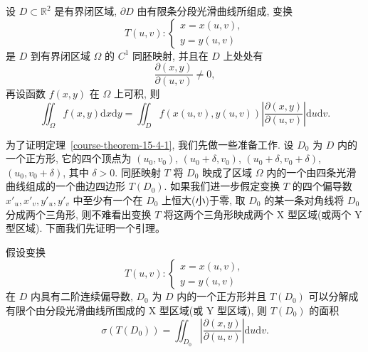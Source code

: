 \documentclass[12pt,fontset=fandol]{ctexart}
\begin{document}
\begin{theorem}\label{course-theorem-15-4-1}\quad 设 $D\subset\mathbb R^2$ 是有界闭区域, $\partial D$ 由有限条分段光滑曲线所组成, 变换
\[
  T(u,v):
  \begin{cases}
    x=x(u,v),\\
    y=y(u,v)
  \end{cases}
\]
是 $D$ 到有界闭区域 $\Omega$ 的 $C^1$ 同胚映射, 并且在 $D$ 上处处有
\[
  \frac{\partial(x,y)}{\partial(u,v)}\ne0,
\]
再设函数 $f(x,y)$ 在 $\Omega$ 上可积, 则
\[
  \iint_\Omega f(x,y)\mathrm dx\mathrm dy
  =\iint_D f(x(u,v),y(u,v))
  \left|\frac{\partial(x,y)}{\partial(u,v)}\right|\mathrm du\mathrm dv.
\]

为了证明定理~\ref{course-theorem-15-4-1}, 我们先做一些准备工作. 设 $D_0$ 为 $D$ 内的一个正方形, 它的四个顶点为 $(u_0,v_0)$, $(u_0+\delta,v_0)$, $(u_0+\delta,v_0+\delta)$, $(u_0,v_0+\delta)$, 其中 $\delta>0$. 同胚映射 $T$ 将 $D_0$ 映成了区域 $\Omega$ 内的一个由四条光滑曲线组成的一个曲边四边形 $T(D_0)$. 如果我们进一步假定变换 $T$ 的四个偏导数 $x'_u,x'_v,y'_u,y'_v$ 中至少有一个在 $D_0$ 上恒大(小)于零, 取 $D_0$ 的某一条对角线将 $D_0$ 分成两个三角形, 则不难看出变换 $T$ 将这两个三角形映成两个 X 型区域(或两个 Y 型区域). 下面我们先证明一个引理。

\end{theorem}
\begin{lemma}\label{course-lemma-15-4-2}\quad 假设变换
\[
  T(u,v):
  \begin{cases}
    x=x(u,v),\\
    y=y(u,v)
  \end{cases}
\]
在 $D$ 内具有二阶连续偏导数, $D_0$ 为 $D$ 内的一个正方形并且 $T(D_0)$ 可以分解成有限个由分段光滑曲线所围成的 X 型区域(或 Y 型区域), 则 $T(D_0)$ 的面积
\[
  \sigma(T(D_0))=\iint_{D_0}\left|\frac{\partial(x,y)}{\partial(u,v)}\right|\mathrm du\mathrm dv.
\]

\end{lemma}
\end{document}
